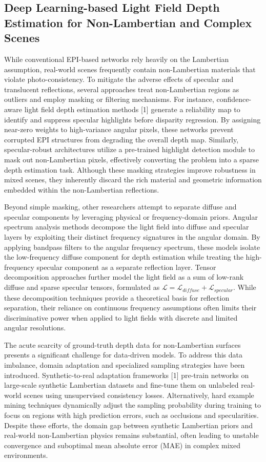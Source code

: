 \subsection{Deep Learning-based Light Field Depth Estimation for Non-Lambertian and Complex Scenes}

While conventional EPI-based networks rely heavily on the Lambertian assumption, real-world scenes frequently contain non-Lambertian materials that violate photo-consistency. To mitigate the adverse effects of specular and translucent reflections, several approaches treat non-Lambertian regions as outliers and employ masking or filtering mechanisms. For instance, confidence-aware light field depth estimation methods [1] generate a reliability map to identify and suppress specular highlights before disparity regression. By assigning near-zero weights to high-variance angular pixels, these networks prevent corrupted EPI structures from degrading the overall depth map. Similarly, specular-robust architectures utilize a pre-trained highlight detection module to mask out non-Lambertian pixels, effectively converting the problem into a sparse depth estimation task. Although these masking strategies improve robustness in mixed scenes, they inherently discard the rich material and geometric information embedded within the non-Lambertian reflections.

Beyond simple masking, other researchers attempt to separate diffuse and specular components by leveraging physical or frequency-domain priors. Angular spectrum analysis methods decompose the light field into diffuse and specular layers by exploiting their distinct frequency signatures in the angular domain. By applying bandpass filters to the angular frequency spectrum, these models isolate the low-frequency diffuse component for depth estimation while treating the high-frequency specular component as a separate reflection layer. Tensor decomposition approaches further model the light field as a sum of low-rank diffuse and sparse specular tensors, formulated as $\mathcal{L} = \mathcal{L}_{diffuse} + \mathcal{L}_{specular}$. While these decomposition techniques provide a theoretical basis for reflection separation, their reliance on continuous frequency assumptions often limits their discriminative power when applied to light fields with discrete and limited angular resolutions.

The acute scarcity of ground-truth depth data for non-Lambertian surfaces presents a significant challenge for data-driven models. To address this data imbalance, domain adaptation and specialized sampling strategies have been introduced. Synthetic-to-real adaptation frameworks [1] pre-train networks on large-scale synthetic Lambertian datasets and fine-tune them on unlabeled real-world scenes using unsupervised consistency losses. Alternatively, hard example mining techniques dynamically adjust the sampling probability during training to focus on regions with high prediction errors, such as occlusions and specularities. Despite these efforts, the domain gap between synthetic Lambertian priors and real-world non-Lambertian physics remains substantial, often leading to unstable convergence and suboptimal mean absolute error (MAE) in complex mixed environments.

